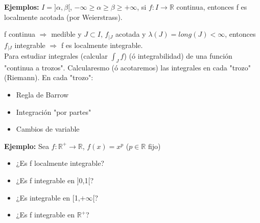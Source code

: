 \documentclass{article}
\begin{document}
\textbf{Ejemplos:} $I = ]\alpha, \beta[$, $-\infty \geq \alpha \geq \beta \geq +\infty$, si $f:I \rightarrow \mathbb{R}$ continua, entonces f es localmente acotada (por Weierstrass).

f continua $\Rightarrow$ medible y $J \subset I$, $f_{|J}$ acotada y $\lambda(J)=long(J) < \infty$, entonces $f_{|J}$ integrable $\Rightarrow$ f es localmente integrable. \\

Para estudiar integrales (calcular $\int_J f$) (ó integrabilidad) de una función "continua a trozos". Calcularesmo (ó acotaremos) las integrales en cada "trozo"(Riemann). En cada "trozo":

\begin{itemize}
\item Regla de Barrow
\item Integración "por partes"
\item Cambios de variable
\end{itemize}

\textbf{Ejemplo:} Sea $f: \mathbb{R}^+ \rightarrow \mathbb{R}$, $f(x)=x^p$ ($p \in \mathbb{R}$ fijo)
\begin{itemize}
\item ¿Es f localmente integrable?
\item ¿Es f integrable en ]0,1[?
\item ¿Es integrable en [1,$+\infty$[?
\item ¿Es f integrable en $\mathbb{R}^+$?
\end{itemize}
\end{document}
